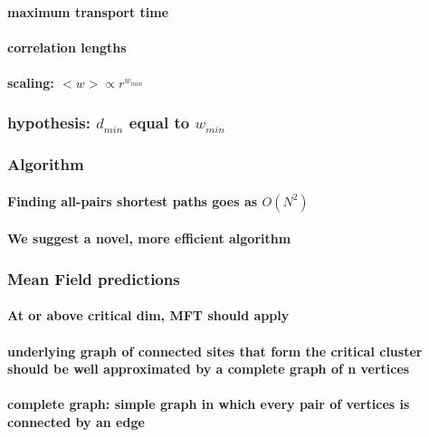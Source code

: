 \documentclass{umthesis}
\begin{document}
\paragraph{maximum transport time}
\label{sec-3.1.3.2.1}
\paragraph{correlation lengths}
\label{sec-3.1.3.2.2}
\paragraph{scaling: $< w > \propto r^{w_{min}}$}
\label{sec-3.1.3.2.3}
\subsubsection{hypothesis: $d_{min}$ equal to $w_{min}$}
\label{sec-3.1.3.3}
\subsubsection{Algorithm}
\label{sec-3.1.3.4}
\paragraph{Finding all-pairs shortest paths goes as $O(N^2)$}
\label{sec-3.1.3.4.1}
\paragraph{We suggest a novel, more efficient algorithm}
\label{sec-3.1.3.4.2}
\subsubsection{Mean Field predictions}
\label{sec-3.1.3.5}
\paragraph{At or above critical dim, MFT should apply}
\label{sec-3.1.3.5.1}
\paragraph{underlying graph of connected sites that form the critical cluster should be well approximated by a complete graph of n vertices}
\label{sec-3.1.3.5.2}
\paragraph{complete graph:  simple graph in which every pair of vertices is connected by an edge}
\label{sec-3.1.3.5.3}
\end{document}
